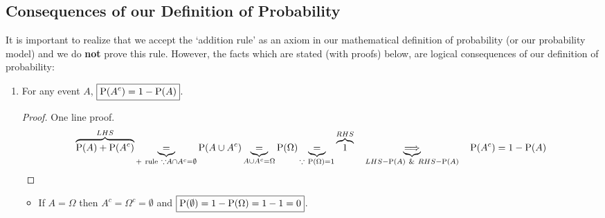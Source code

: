 \subsection{Consequences of our Definition of Probability}\label{S:ConseqDefProb}
It is important to realize that we accept the `addition rule' as an axiom in our mathematical definition of probability (or our probability model) and we do {\bf not} prove this rule.  However, the facts which are stated ({\scriptsize with proofs}) below, are logical consequences of our definition of probability:
\begin{enumerate}
\item For any event $A$, $\boxed{\P(A^c) = 1 - \P(A)}$.
{\scriptsize
\begin{proof}
One line proof.
\[
\overbrace{\P(A) + \P(A^c)}^{LHS} \underbrace{=}_{+~\text{rule}~\because A \cap A^c = \emptyset} \P(A \cup A^c) \underbrace{=}_{A \cup A^c = \Omega} \P(\Omega) \underbrace{=}_{\because~\P(\Omega) = 1} \overbrace{1}^{RHS} \quad \underbrace{\Longrightarrow}_{LHS-\P(A)~\&~RHS-\P(A)} \quad \P(A^c) = 1-\P(A)
\]
\end{proof}
}
\begin{itemize}
\item If $A = \Omega$ then $A^c = \Omega^c = \emptyset$ and 
$\boxed{\P(\emptyset) = 1-\P(\Omega) = 1-1 = 0}$.
\end{itemize}


\end{enumerate}
